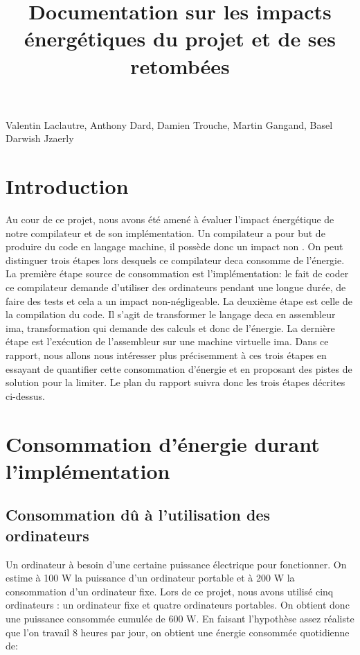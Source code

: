 \documentclass[12pt, a4paper, one side]{article}
\title{Documentation sur les impacts énergétiques du projet et de ses retombées}
\author{}
\date{}
\begin{document}
\maketitle

\begin{center}
    Valentin Laclautre, Anthony Dard, Damien Trouche, Martin Gangand, Basel Darwish Jzaerly
\end{center}

\tableofcontents

\newpage

\section{Introduction}

Au cour de ce projet, nous avons été amené à évaluer l'impact énergétique de notre compilateur et de son implémentation. Un compilateur a pour but de produire du code en langage machine, il possède donc un impact non . On peut distinguer trois étapes lors desquels ce compilateur deca consomme de l'énergie. La première étape source de consommation est l'implémentation: le fait de coder ce compilateur demande d'utiliser des ordinateurs pendant une longue durée, de faire des tests et cela a un impact non-négligeable. La deuxième étape est celle de la compilation du code. Il s'agit de transformer le langage deca en assembleur ima, transformation qui demande des calculs et donc de l'énergie. La dernière étape est l'exécution de l'assembleur sur une machine virtuelle ima. Dans ce rapport, nous allons nous intéresser plus précisemment à ces trois étapes en essayant de quantifier cette consommation d'énergie et en proposant des pistes de solution pour la limiter. Le plan du rapport suivra donc les trois étapes décrites ci-dessus.



\section{Consommation d'énergie durant l'implémentation}

\subsection{Consommation dû à l'utilisation des ordinateurs}

Un ordinateur à besoin d'une certaine puissance électrique pour fonctionner. On estime à 100 W la puissance d'un ordinateur portable et à 200 W la consommation d'un ordinateur fixe. Lors de ce projet, nous avons utilisé cinq ordinateurs : un ordinateur fixe et quatre ordinateurs portables. On obtient donc une puissance consommée cumulée de 600 W. En faisant l'hypothèse assez réaliste que l'on travail 8 heures par jour, on obtient une énergie consommée quotidienne de:
\end{document}
